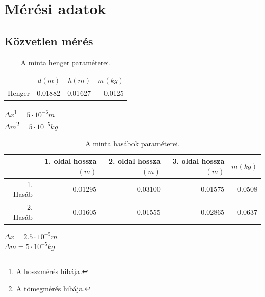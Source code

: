 \documentclass[10pt,pdftex]{report}
\begin{document}
\section*{Mérési adatok}
\subsection*{Közvetlen mérés}
\begin{table}[H]
    \centering
    \begin{tabular}{|r|r|r|r|}
        \hline
        & $d$\footnotemark$(m)$ & $h$\footnotemark$(m)$ & $m$\footnotemark$(kg)$ \\
        \hline
        Henger & 0.01882 & 0.01627 & 0.0125 \\
        \hline
    \end{tabular}
    \caption{A minta henger paraméterei.}
\end{table}
\noindent $\Delta x$\footnote[4]{A hosszmérés hibája.}$=5\cdot10^{-6}m$\\
\noindent $\Delta m$\footnote[5]{A tömegmérés hibája.}$=5\cdot10^{-5}kg$
\begin{table}[H]
    \centering
    \begin{tabular}{|r|r|r|r|r|}
        \hline
        & 1. oldal hossza$(m)$ & 2. oldal hossza$(m)$ & 3. oldal hossza$(m)$ & $m(kg)$ \\
        \hline
        1. Hasáb & 0.01295 & 0.03100 & 0.01575 & 0.0508 \\
        \hline
        2. Hasáb & 0.01605 & 0.01555 & 0.02865 & 0.0637 \\
        \hline
    \end{tabular}
    \caption{A minta hasábok paraméterei.}
\end{table}
\noindent $\Delta x=2.5\cdot10^{-5}m$\\
\noindent $\Delta m=5\cdot10^{-5}kg$
\end{document}
